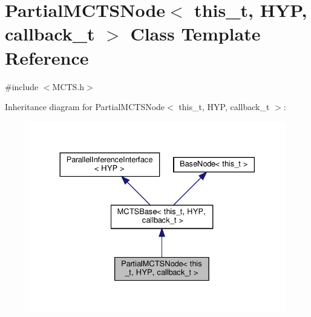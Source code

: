 \hypertarget{class_partial_m_c_t_s_node}{}\section{Partial\+M\+C\+T\+S\+Node$<$ this\+\_\+t, H\+YP, callback\+\_\+t $>$ Class Template Reference}
\label{class_partial_m_c_t_s_node}


{\ttfamily \#include $<$M\+C\+T\+S.\+h$>$}



Inheritance diagram for Partial\+M\+C\+T\+S\+Node$<$ this\+\_\+t, H\+YP, callback\+\_\+t $>$\+:
\nopagebreak
\begin{figure}[H]
\begin{center}
\leavevmode
\includegraphics[width=330pt]{class_partial_m_c_t_s_node__inherit__graph}
\end{center}
\end{figure}


